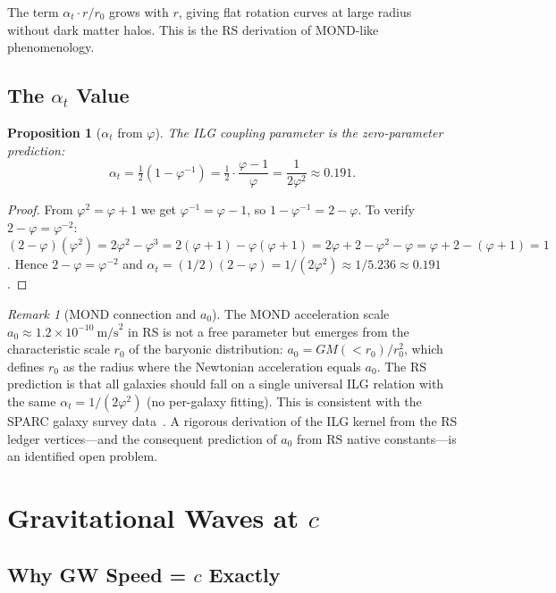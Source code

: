 \documentclass[12pt,a4paper]{article}
\newtheorem{proposition}[theorem]{Proposition}
\theoremstyle{definition}
\theoremstyle{remark}
\newtheorem{remark}[theorem]{Remark}
\begin{document}
The term $\alpha_t \cdot r/r_0$ grows with $r$, giving flat rotation curves at large
radius without dark matter halos.  This is the RS derivation of MOND-like phenomenology.

\subsection{The $\alpha_t$ Value}

\begin{proposition}[$\alpha_t$ from $\varphi$]
The ILG coupling parameter is the zero-parameter prediction:
\[
\alpha_t = \tfrac{1}{2}(1 - \varphi^{-1}) = \tfrac{1}{2}\cdot\frac{\varphi - 1}{\varphi}
= \frac{1}{2\varphi^2} \approx 0.191.
\]
\end{proposition}

\begin{proof}
From $\varphi^2 = \varphi + 1$ we get $\varphi^{-1} = \varphi - 1$, so
$1 - \varphi^{-1} = 2 - \varphi$.  To verify $2 - \varphi = \varphi^{-2}$:
$(2-\varphi)(\varphi^2) = 2\varphi^2 - \varphi^3 = 2(\varphi+1) - \varphi(\varphi+1)
= 2\varphi+2-\varphi^2-\varphi = \varphi+2-(\varphi+1) = 1$.
Hence $2 - \varphi = \varphi^{-2}$ and $\alpha_t = (1/2)(2-\varphi) = 1/(2\varphi^2)
\approx 1/5.236 \approx 0.191$.
\end{proof}

\begin{remark}[MOND connection and $a_0$]
The MOND acceleration scale $a_0 \approx 1.2 \times 10^{-10}~\mathrm{m/s}^2$
in RS is not a free parameter but emerges from the characteristic scale $r_0$
of the baryonic distribution: $a_0 = GM(<r_0)/r_0^2$, which defines $r_0$ as
the radius where the Newtonian acceleration equals $a_0$.  The RS prediction
is that all galaxies should fall on a single universal ILG relation with the
same $\alpha_t = 1/(2\varphi^2)$ (no per-galaxy fitting).  This is consistent
with the SPARC galaxy survey data~\cite{milgrom}.  A rigorous derivation of the
ILG kernel from the RS ledger vertices---and the consequent prediction of $a_0$
from RS native constants---is an identified open problem.
\end{remark}

\section{Gravitational Waves at $c$}
\label{sec:gw}

\subsection{Why GW Speed = $c$ Exactly}
\end{document}
